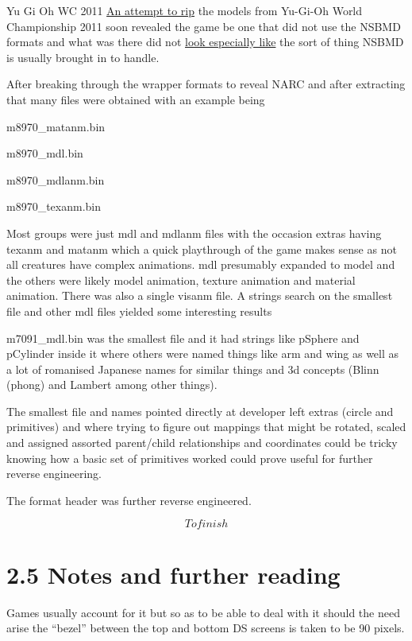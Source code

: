 \documentclass[
]{book}
\begin{document}
Yu Gi Oh WC 2011 \href{http://gbatemp.net/topic/322715-yu-gi-oh-world-championship-2011-model-ripping/}{An attempt to rip} the models from Yu-Gi-Oh World Championship 2011 soon revealed the game be one that did not use the NSBMD formats and what was there did not \href{http://www.youtube.com/watch?\&v=ccqzbFvC3Vg}{look especially like} the sort of thing NSBMD is usually brought in to handle.

After breaking through the wrapper formats to reveal NARC and after extracting that many files were obtained with an example being

m8970\_matanm.bin

m8970\_mdl.bin

m8970\_mdlanm.bin

m8970\_texanm.bin

Most groups were just mdl and mdlanm files with the occasion extras having texanm and matanm which a quick playthrough of the game makes sense as not all creatures have complex animations. mdl presumably expanded to model and the others were likely model animation, texture animation and material animation. There was also a single visanm file. A strings search on the smallest file and other mdl files yielded some interesting results

m7091\_mdl.bin was the smallest file and it had strings like pSphere and pCylinder inside it where others were named things like arm and wing as well as a lot of romanised Japanese names for similar things and 3d concepts (Blinn (phong) and Lambert among other things).

The smallest file and names pointed directly at developer left extras (circle and primitives) and where trying to figure out mappings that might be rotated, scaled and assigned assorted parent/child relationships and coordinates could be tricky knowing how a basic set of primitives worked could prove useful for further reverse engineering.

The format header was further reverse engineered.

\[To finish\]

\hypertarget{notes-and-further-reading}{%
\section{2.5 Notes and further reading}\label{notes-and-further-reading}}

Games usually account for it but so as to be able to deal with it should the need arise the ``bezel'' between the top and bottom DS screens is taken to be 90 pixels.
\end{document}
